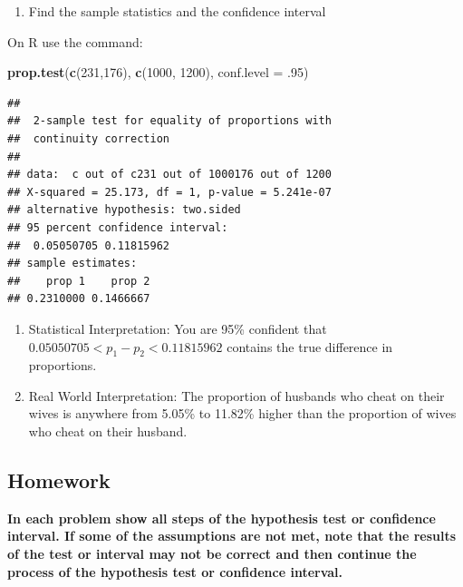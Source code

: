 \documentclass[
]{book}
\newenvironment{Shaded}{\begin{snugshade}}{\end{snugshade}}
\newcommand{\DataTypeTok}[1]{\textcolor[rgb]{0.13,0.29,0.53}{#1}}
\newcommand{\DecValTok}[1]{\textcolor[rgb]{0.00,0.00,0.81}{#1}}
\newcommand{\FloatTok}[1]{\textcolor[rgb]{0.00,0.00,0.81}{#1}}
\newcommand{\KeywordTok}[1]{\textcolor[rgb]{0.13,0.29,0.53}{\textbf{#1}}}
\newcommand{\NormalTok}[1]{#1}
\providecommand{\tightlist}{%
  \setlength{\itemsep}{0pt}\setlength{\parskip}{0pt}}
\begin{document}
\begin{enumerate}
\def\labelenumi{\arabic{enumi}.}
\setcounter{enumi}{2}
\tightlist
\item
  Find the sample statistics and the confidence interval
\end{enumerate}

On R use the command:

\begin{Shaded}
\begin{Highlighting}[]
\KeywordTok{prop.test}\NormalTok{(}\KeywordTok{c}\NormalTok{(}\DecValTok{231}\NormalTok{,}\DecValTok{176}\NormalTok{), }\KeywordTok{c}\NormalTok{(}\DecValTok{1000}\NormalTok{, }\DecValTok{1200}\NormalTok{), }\DataTypeTok{conf.level =} \FloatTok{.95}\NormalTok{)}
\end{Highlighting}
\end{Shaded}

\begin{verbatim}
## 
## 	2-sample test for equality of proportions with
## 	continuity correction
## 
## data:  c out of c231 out of 1000176 out of 1200
## X-squared = 25.173, df = 1, p-value = 5.241e-07
## alternative hypothesis: two.sided
## 95 percent confidence interval:
##  0.05050705 0.11815962
## sample estimates:
##    prop 1    prop 2 
## 0.2310000 0.1466667
\end{verbatim}

\begin{enumerate}
\def\labelenumi{\arabic{enumi}.}
\setcounter{enumi}{3}
\item
  Statistical Interpretation: You are 95\% confident that \(0.05050705<p_1-p_2<0.11815962\) contains the true difference in proportions.
\item
  Real World Interpretation: The proportion of husbands who cheat on their wives is anywhere from 5.05\% to 11.82\% higher than the proportion of wives who cheat on their husband.
\end{enumerate}

\hypertarget{homework}{%
\subsection{Homework}\label{homework}}

\textbf{In each problem show all steps of the hypothesis test or confidence interval. If some of the assumptions are not met, note that the results of the test or interval may not be correct and then continue the process of the hypothesis test or confidence interval.}
\end{document}

